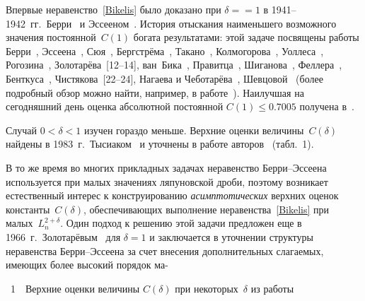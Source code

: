 \begin{multicols}{2}
Впервые неравенство~\eqref{Bikelis} было доказано при $\delta=$\linebreak $=1$ в
1941--1942~гг.\ Берри~\cite{Berry1941} и
Эс\-се\-е\-ном~\cite{Esseen1942}. История отыскания
наименьшего возможного значения постоянной~$C(1)$ богата
результатами: этой задаче посвящены работы
Берри~\cite{Berry1941}, Эссеена~\cite{Esseen1942,
Esseen1956}, Сюя~\cite{Hsu1945},
Бергстрёма~\cite{Bergstrom1949}, Такано~\cite{Takano1951}, Колмогорова~\cite{Kolmogorov1953},
Уоллеса~\cite{Wallace1958}, 
Рогозина~\cite{Rogozin1960},
Золотарёва~[12--14], ван~Бика~\cite{VanBeek1971, VanBeek1972},
Правитца~\cite{Prawitz1975}, Шиганова~\cite{Shiganov1982}, Феллера~\cite{Feller1967},
Бенткуса~\cite{Bentkus1991, Bentkus1994},
Чистякова~[22--24], Нагаева и
Чеботарёва~\cite{NagaevChebotarev2006},
Шевцовой~\cite{Shevtsova2006, Shevtsova2008} (более подробный
обзор можно найти, например, в работе~\cite{Shevtsova2008}).
Наилучшая на сегодняшний день оценка абсолютной постоянной
$C(1)\le0.7005$ получена в~\cite{Shevtsova2008}.

Случай $0<\delta<1$ изучен гораздо меньше. Верхние оценки величины~$C(\delta)$
найдены  в 1983~г.\ Тысиаком~\cite{Tysiak1983} и
уточнены в работе авторов~\cite{GaponovaKorchaginShevtsova2009} (табл.~1).



В то же время во многих прикладных задачах неравенство
Берри--Эссеена используется при малых значениях ляпуновской дроби,
поэтому возникает естественный интерес к конструированию {\it
асимптотических} верхних оценок константы~$C(\delta)$, обеспечивающих
выполнение неравенства~\eqref{Bikelis} при малых~$L_n^{2+\delta}$. Один
подход к решению этой задачи предложен еще в 1966~г.\
Золотарёвым~\cite{Zolotarev1966} для $\delta=1$ и заключается в
уточнении структуры неравенства Берри--Эссеена за счет внесения
дополнительных  слагаемых, имеющих более высокий порядок ма-\linebreak\vspace*{-12pt}
\columnbreak


\noindent %
\begin{center}
\parbox{38mm}{{\tablename~1}\ \ \small{Верхние оценки величины $C(\delta)$ при некоторых~$\delta$ из
работы~\cite{GaponovaKorchaginShevtsova2009}}}
\end{center}
\vspace*{6pt}


\end{multicols}
